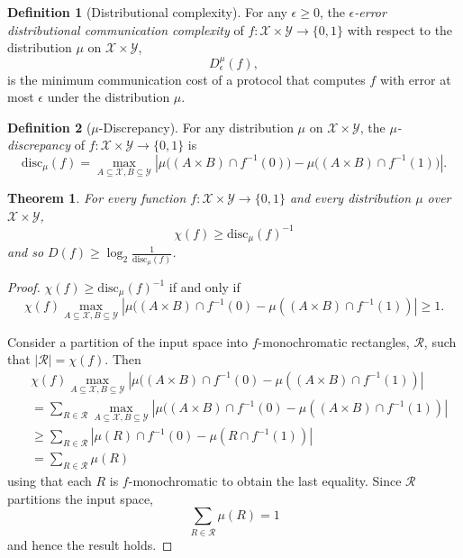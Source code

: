 \documentclass[11pt]{amsart}
\theoremstyle{plain}
\newtheorem{theorem}{Theorem}
\theoremstyle{definition}
\newtheorem{definition}{Definition}
\theoremstyle{plain}
\newcommand{\calX}{\mathcal{X}}
\newcommand{\calY}{\mathcal{Y}}
\newcommand{\disc}{\mathrm{disc}}
\begin{document}
\begin{definition}[Distributional complexity]
For any $\epsilon \ge 0$, the \emph{$\epsilon$-error distributional communication complexity} of $f : \calX \times \calY \to \{0,1\}$ with respect to the distribution $\mu$ on $\calX \times \calY$,
\[
D_\epsilon^{\mu}(f),
\]
is the minimum communication cost of a protocol that computes $f$ with error at most $\epsilon$ under the distribution $\mu$.
\end{definition}

\begin{definition}[$\mu$-Discrepancy]
For any distribution $\mu$ on $\calX \times \calY$, 
the \emph{$\mu$-discrepancy} of $f : \calX \times \calY \to \{0,1\}$ is
\[
\disc_\mu(f) = \max_{A \subseteq \calX, B \subseteq \calY} 
\left| \mu\big( (A \times B) \cap f^{-1}(0) \big) - \mu\big( (A \times B) \cap f^{-1}(1)\big) \right|.
\]
\end{definition}

\begin{theorem}
For every function $f : \calX \times \calY \to \{0,1\}$ and every distribution $\mu$ over $\calX \times \calY$, 
\[
\chi(f) \ge \disc_\mu(f)^{-1}
\] 
and so $D(f) \ge \log_2 \frac1{\disc_\mu(f)}$.
\end{theorem}

\begin{proof}
	
$\chi(f) \geq \disc_\mu(f)^{-1}$ if and only if
$$\chi(f)\max_{A \subseteq \calX, B \subseteq \calY}\left|\mu((A\times B)\cap f^{-1}(0) -\mu((A\times B)\cap f^{-1}(1)) \right| \geq 1.$$

Consider a partition of the input space into $f$-monochromatic rectangles, $\mathcal R$, such that $|\mathcal R| = \chi(f)$. Then
\begin{align*}
&\chi(f)\max_{A \subseteq \calX, B \subseteq \calY}\left|\mu((A\times B)\cap f^{-1}(0) -\mu((A\times B)\cap f^{-1}(1)) \right| \\
& = \sum_{R\in \mathcal R}\max_{A \subseteq \calX, B \subseteq \calY}\left|\mu((A\times B)\cap f^{-1}(0) -\mu((A\times B)\cap f^{-1}(1)) \right|\\ 
&\geq \sum_{R \in \mathcal{R}}\left|\mu(R)\cap f^{-1}(0) -\mu(R\cap f^{-1}(1)) \right|\\ 
&= \sum_{R \in \mathcal{R}} \mu(R)
\end{align*}
using that each $R$ is $f$-monochromatic to obtain the last equality. Since $\mathcal R$ partitions the input space,
$$\sum_{R \in \mathcal R} \mu(R)=1$$
and hence the result holds.
\end{proof}
\end{document}
